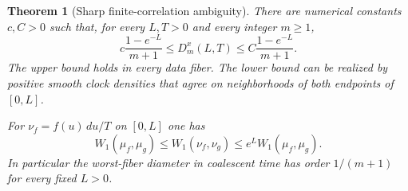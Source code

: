 \documentclass[11pt]{article}
\newtheorem{theorem}{Theorem}[section]
\theoremstyle{definition}
\theoremstyle{remark}
\numberwithin{equation}{section}
\begin{document}
\begin{theorem}[Sharp finite-correlation ambiguity]
\label{restore:finite}
There are numerical constants $c,C>0$ such that, for every $L,T>0$ and
every integer $m\ge1$,
\begin{equation}\label{restore:diameter}
 c\frac{1-e^{-L}}{m+1}\le D_m^x(L,T)
                \le C\frac{1-e^{-L}}{m+1}.
\end{equation}
The upper bound holds in every data fiber.  The lower bound can be
realized by positive smooth clock densities that agree on neighborhoods
of both endpoints of $[0,L]$.

For $\nu_f=f(u)\,du/T$ on $[0,L]$ one has
\begin{equation}\label{restore:metriccompare}
 W_1(\mu_f,\mu_g)\le W_1(\nu_f,\nu_g)
                              \le e^L W_1(\mu_f,\mu_g).
\end{equation}
In particular the worst-fiber diameter in coalescent time has order
$1/(m+1)$ for every fixed $L>0$.
\end{theorem}
\end{document}
